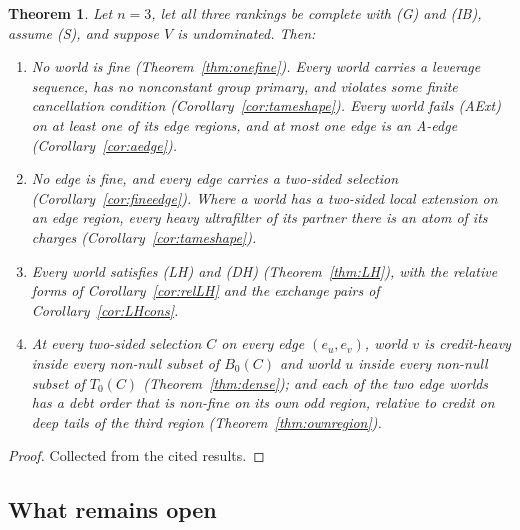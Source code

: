 \documentclass[11pt]{article}
\newtheorem{theorem}{Theorem}
\theoremstyle{definition}\newtheorem{definition}[theorem]{Definition}
\theoremstyle{remark}\newtheorem{remark}[theorem]{Remark}
\begin{document}
\begin{theorem}\label{thm:shape}
Let $n=3$, let all three rankings be complete with (G) and (IB), assume (S),
and suppose $V$ is undominated. Then:
\begin{enumerate}[label=(\alph*),leftmargin=*,itemsep=2pt]
\item No world is fine (Theorem~\ref{thm:onefine}). Every world carries a
leverage sequence, has no nonconstant group primary, and violates some
finite cancellation condition (Corollary~\ref{cor:tameshape}). Every world
fails (AExt) on at least one of its edge regions, and at most one edge is an
A-edge (Corollary~\ref{cor:aedge}).
\item No edge is fine, and every edge carries a two-sided selection
(Corollary~\ref{cor:fineedge}). Where a world has a two-sided local
extension on an edge region, every heavy ultrafilter of its partner there is
an atom of its charges (Corollary~\ref{cor:tameshape}).
\item Every world satisfies (LH) and (DH) (Theorem~\ref{thm:LH}), with the
relative forms of Corollary~\ref{cor:relLH} and the exchange pairs of
Corollary~\ref{cor:LHcons}.
\item At every two-sided selection $C$ on every edge $(e_u,e_v)$, world $v$
is credit-heavy inside every non-null subset of $B_0(C)$ and world $u$ inside
every non-null subset of $T_0(C)$ (Theorem~\ref{thm:dense}); and each of the
two edge worlds has a debt order that is non-fine on its own odd region,
relative to credit on deep tails of the third region
(Theorem~\ref{thm:ownregion}).
\end{enumerate}
\end{theorem}
\begin{proof}
Collected from the cited results.
\end{proof}

\subsection*{What remains open}
\end{document}
